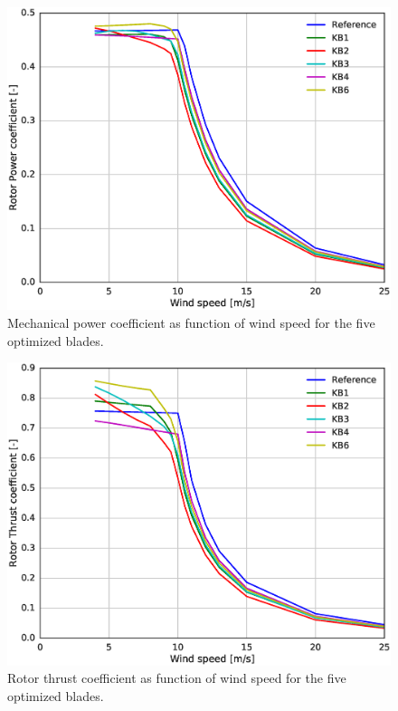 \begin{figure}[!ht]
\begin{center}
	\includegraphics[width=.85\linewidth]{figures/KBcomp_Cp.eps}
\end{center}
\caption{Mechanical power coefficient as function of wind speed for the five optimized blades.}
\label{fig:cp}
\end{figure}

\begin{figure}[!ht]
\begin{center}
	\includegraphics[width=.85\linewidth]{figures/KBcomp_CT.eps}
\end{center}
\caption{Rotor thrust coefficient as function of wind speed for the five optimized blades.}
\label{fig:ct}
\end{figure}

